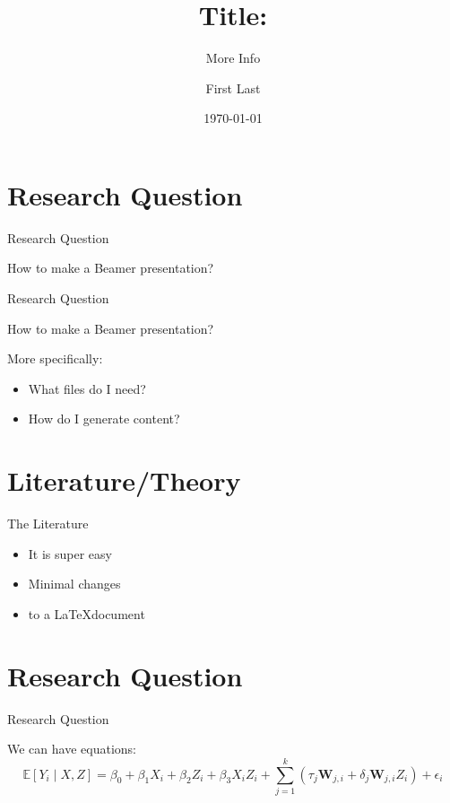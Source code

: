 \documentclass[bigger]{beamer}
\author{First Last}
\title{Title:}
\subtitle{More Info}
\institute{Institution \\ Department}
\date{\today}
\begin{document}
\maketitle

\section{Research Question}
\begin{frame}{Research Question}
\begin{center}
How to make a Beamer presentation?
\end{center}
\end{frame}

\begin{frame}{Research Question}
\begin{center}
How to make a Beamer presentation?
\end{center}
    \vspace{1cm}
More specifically:
\begin{itemize}
\item What files do I need?
\item How do I generate content?
\end{itemize}
\end{frame}

\section{Literature/Theory}
\begin{frame}{The Literature}
\begin{itemize}
\item It is super easy
\item Minimal changes
\item to a \LaTeX document
\end{itemize}
\end{frame}


\section{Research Question}
\begin{frame}{Research Question}

We can have equations: \\

\begin{equation}
\mathbb{E}[Y_{i} \mid X,Z]  = \beta_{0} + \beta_{1}X_{i} + \beta_{2}Z_{i}  + \beta_{3} X_{i}Z_{i} + \sum_{j=1}^{k} (\tau_{j} \bm{W}_{j,i} + \delta_{j} \bm{W}_{j,i} Z_{i}) + \epsilon_{i}   
\end{equation}

\end{frame}
\end{document}
